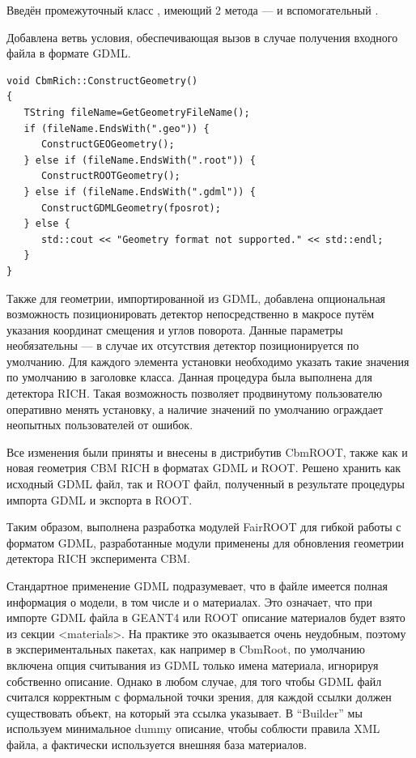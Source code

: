Введён промежуточный класс , имеющий 2 метода ---  и вспомогательный .

Добавлена ветвь условия, обеспечивающая вызов  в случае получения входного файла в формате GDML.

\begin{lstlisting}
void CbmRich::ConstructGeometry()
{
   TString fileName=GetGeometryFileName();
   if (fileName.EndsWith(".geo")) {
      ConstructGEOGeometry();
   } else if (fileName.EndsWith(".root")) {
      ConstructROOTGeometry();
   } else if (fileName.EndsWith(".gdml")) {
      ConstructGDMLGeometry(fposrot);
   } else {
      std::cout << "Geometry format not supported." << std::endl;
   }
}
\end{lstlisting}

Также для геометрии, импортированной из GDML, добавлена опциональная возможность позиционировать детектор непосредственно в макросе путём указания координат смещения и углов поворота. Данные параметры необязательны --- в случае их отсутствия детектор позиционируется по умолчанию. Для каждого элемента установки необходимо указать такие значения по умолчанию в заголовке класса. Данная процедура была выполнена для детектора RICH. Такая возможность позволяет продвинутому пользователю оперативно менять установку, а наличие значений по умолчанию ограждает неопытных пользователей от ошибок.

Все изменения были приняты и внесены в дистрибутив CbmROOT, также как и новая геометрия CBM RICH в форматах GDML и ROOT. Решено хранить как исходный GDML файл, так и ROOT файл, полученный в результате процедуры импорта GDML и экспорта в ROOT.

Таким образом, выполнена разработка модулей FairROOT для гибкой работы с форматом GDML, разработанные модули применены для обновления геометрии детектора RICH эксперимента CBM.

Стандартное применение GDML подразумевает, что в файле имеется полная информация о модели, в том числе и о материалах. Это означает, что при импорте GDML файла в GEANT4 или ROOT описание материалов будет взято из секции <materials>. На практике это оказывается очень неудобным, поэтому в экспериментальных пакетах, как например в CbmRoot, по умолчанию включена опция считывания из GDML только имена материала, игнорируя собственно описание. Однако в любом случае, для того чтобы GDML файл считался корректным с формальной точки зрения, для каждой ссылки должен существовать объект, на который эта ссылка указывает. В ``Builder'' мы используем минимальное dummy \todo описание, чтобы соблюсти правила XML файла, а фактически используется внешняя база материалов.
